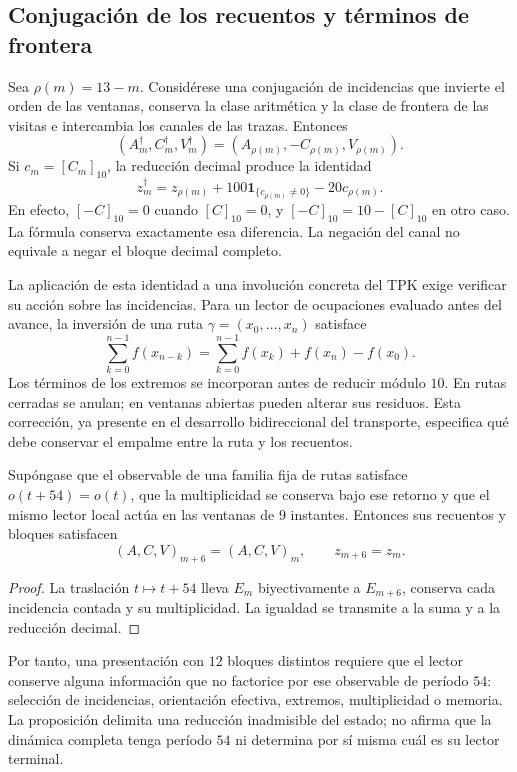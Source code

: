 \subsection{Conjugación de los recuentos y términos de frontera}
\label{subsec:registro-conjugacion-incidencial}

Sea \(\rho(m)=13-m\). Considérese una conjugación de incidencias
que invierte el orden de las ventanas, conserva la clase aritmética y la
clase de frontera de las visitas e intercambia los canales de las trazas.
Entonces
\[
 (A_m^\dagger,C_m^\dagger,V_m^\dagger)
 =(A_{\rho(m)},-C_{\rho(m)},V_{\rho(m)}).
\]
Si \(c_m=[C_m]_{10}\), la reducción decimal produce la identidad
\begin{equation}
 z_m^\dagger=z_{\rho(m)}
       +100\mathbf1_{\{c_{\rho(m)}\ne0\}}-20c_{\rho(m)}.
 \label{eq:registro-conjugacion-decimal}
\end{equation}
En efecto, \([-C]_{10}=0\) cuando \([C]_{10}=0\), y
\([-C]_{10}=10-[C]_{10}\) en otro caso. La fórmula conserva
exactamente esa diferencia. La negación del canal no equivale a negar
el bloque decimal completo.

La aplicación de esta identidad a una involución concreta del TPK exige
verificar su acción sobre las incidencias. Para un lector de ocupaciones
evaluado antes del avance, la inversión de una ruta
\(\gamma=(x_0,\ldots,x_n)\) satisface
\[
 \sum_{k=0}^{n-1}f(x_{n-k})
 =\sum_{k=0}^{n-1}f(x_k)+f(x_n)-f(x_0).
\]
Los términos de los extremos se incorporan antes de reducir módulo
\(10\). En rutas cerradas se anulan; en ventanas abiertas pueden
alterar sus residuos. Esta corrección, ya presente en el desarrollo
bidireccional del transporte, especifica qué debe conservar el empalme
entre la ruta y los recuentos.

\begin{proposition}
Supóngase que el observable de una familia fija de rutas satisface
\(o(t+54)=o(t)\), que la multiplicidad se conserva bajo ese retorno
y que el mismo lector local actúa en las ventanas de \(9\) instantes.
Entonces sus recuentos y bloques satisfacen
\[
 (A,C,V)_{m+6}=(A,C,V)_m,\qquad z_{m+6}=z_m.
\]
\end{proposition}

\begin{proof}
La traslación \(t\mapsto t+54\) lleva \(E_m\) biyectivamente
a \(E_{m+6}\), conserva cada incidencia contada y su multiplicidad.
La igualdad se transmite a la suma y a la reducción decimal.
\end{proof}

Por tanto, una presentación con \(12\) bloques distintos requiere que
el lector conserve alguna información que no factorice por ese observable
de período \(54\): selección de incidencias, orientación efectiva,
extremos, multiplicidad o memoria. La proposición delimita una reducción
inadmisible del estado; no afirma que la dinámica completa tenga
período \(54\) ni determina por sí misma cuál es su lector terminal.
